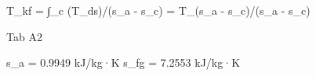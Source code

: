 T_kf = ∫_c (T_ds)/(s_a - s_c) = T_(s_a - s_c)/(s_a - s_c)

Tab A2

s_a = 0.9949 kJ/kg·K  s_fg = 7.2553 kJ/kg·K
